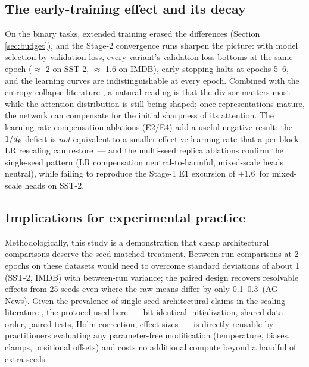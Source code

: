 \subsection{The early-training effect and its decay}\label{sec:early}
On the binary tasks, extended training erased the differences (Section
\ref{sec:budget}), and the Stage-2 convergence runs sharpen the picture: with
model selection by validation loss, every variant's validation loss bottoms at
the same epoch ($\approx$ 2 on SST-2, $\approx$ 1.6 on IMDB), early stopping
halts at epochs 5--6, and the learning curves are indistinguishable at every
epoch. Combined with the entropy-collapse literature
\cite{zhai2023,dong2021}, a natural reading is that the divisor matters most
while the attention distribution is still being shaped; once representations
mature, the network can compensate for the initial sharpness of its attention.
The learning-rate compensation ablations (E2/E4) add a useful negative result:
the $1/d_k$ deficit is \emph{not} equivalent to a smaller effective learning rate
that a per-block LR rescaling can restore~--- and the multi-seed replica
ablations confirm the single-seed pattern (LR compensation neutral-to-harmful,
mixed-scale heads neutral), while failing to reproduce the Stage-1 E1 excursion
of $+1.6$\,\pp{} for mixed-scale heads on SST-2.

\subsection{Implications for experimental practice}\label{sec:practice}
Methodologically, this study is a demonstration that cheap architectural
comparisons deserve the seed-matched treatment. Between-run comparisons at 2
epochs on these datasets would need to overcome standard deviations of about
1\,\pp{} (SST-2, IMDB) with between-run variance; the paired design recovers
resolvable effects from 25 seeds even where the raw means differ by only
0.1--0.3\,\pp{} (AG News). Given the prevalence of single-seed architectural
claims in the scaling literature \cite{bouthillier2021,dodge2019,dror2018}, the
protocol used here~--- bit-identical initialization, shared data order, paired
tests, Holm correction, effect sizes~--- is directly reusable by practitioners
evaluating any parameter-free modification (temperature, biases, clamps,
positional offsets) and costs no additional compute beyond a handful of extra
seeds.


